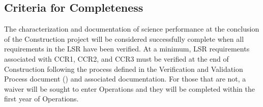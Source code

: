 



\subsection{Criteria for Completeness}

The characterization and documentation of science performance at the conclusion of the Construction project will be considered successfully complete when all requirements in the LSR have been verified.
At a minimum, LSR requirements associated with CCR1, CCR2, and CCR3 must be verified at the end of Construction following the process defined in the Verification and Validation Process document () and associated documentation.
For those that are not, a waiver will be sought to enter Operations and they will be completed within the first year of Operations.


